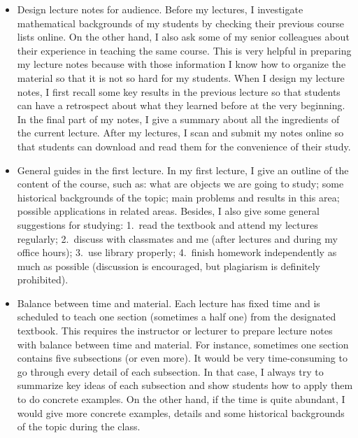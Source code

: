 \documentclass[10pt,a4paper]{article}
\begin{document}
\begin{itemize}
\item Design lecture notes for audience. 
Before my lectures, I investigate mathematical backgrounds of my students by checking their previous course lists online. 
On the other hand, I also ask some of my senior colleagues about their experience in teaching the same course. 
This is very helpful in preparing my lecture notes because with those information 
I know how to organize the material so that it is not so hard for my students. 
When I design my lecture notes, I first recall some key results in the previous lecture so that students 
can have a  retrospect about what they learned before at the very beginning. 
In the final part of my notes, I give a summary about all the ingredients of the current lecture. 
After my lectures, I scan and submit my notes online so that students can download and read them for the convenience of their study.

\item General guides in the first lecture. In my first lecture, I give an outline of the content of the course, such as: 
what are objects we are going to study;
some historical backgrounds of the topic; main problems and results in this area; possible applications in related areas. 
Besides, I also give some general suggestions for studying: 1.\ read the textbook and attend my lectures regularly; 
2.\ discuss with classmates and me (after lectures and during my office hours); 
3.\ use library properly; 4.\ finish homework independently as much as possible (discussion is encouraged, 
but plagiarism is definitely prohibited).  

\item Balance between time and material. Each lecture has fixed time and is scheduled to teach one section 
(sometimes a half one) from the designated textbook. 
This requires the instructor or lecturer to prepare lecture notes with balance between time and material. 
For instance, sometimes one section contains five subsections (or even more). 
It would be very time-consuming to go through every detail of each subsection. In that case, 
I always try to 
summarize key ideas of each subsection and show students how to apply them to do concrete examples. 
On the other hand, if the time is quite abundant, 
I would give more concrete examples, details and some historical backgrounds of the topic during the class.  


\end{itemize}
\end{document}
